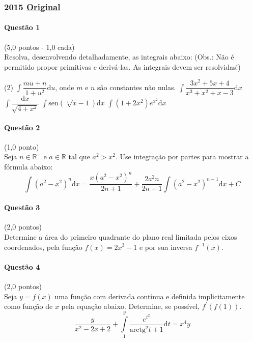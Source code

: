 \documentclass[12pt,a4paper]{article}
\newcommand{\R}{\mathbb{R}}
\newcommand{\original}[1]{\tiny \href{#1}{Original} \normalsize}
\begin{document}
\newpage
\subsubsection{2015 \original{https://drive.google.com/open?id=1dBXZ8g77vz10Pv-SOPZ6VNYKsHVNDqgd}}

\paragraph{Questão 1} (5,0 pontos - 1,0 cada)\\
Resolva, desenvolvendo detalhadamente, as integrais abaixo:
(Obs.: Não é permitido propor primitivas e derivá-las. As integrais devem ser resolvidas!)

\begin{tasks}(2)
\task $\displaystyle\int \dfrac{mu+n}{1+u^2}\mathrm{d}u$, onde $m$ e $n$ são constantes não nulas.
\task $\displaystyle\int \dfrac{3x^2 + 5x + 4}{x^3 + x^2 + x -3}\mathrm{d}x$
\task $\displaystyle\int \dfrac{\mathrm{d}x}{\sqrt{4+x^2}}$
\task $\displaystyle\int \mathrm{sen}(\sqrt[4]{x-1})\mathrm{d}x$
\task $\displaystyle\int (1+2x^2)e^{x^2}\mathrm{d}x$
\end{tasks}

\paragraph{Questão 2} (1,0 ponto)\\
Seja $n\in \R^+$ e $a\in\R$ tal que $a^2>x^2$. Use integração por partes para mostrar a fórmula abaixo:$$\int (a^2-x^2)^n\mathrm{d}x = \dfrac{x(a^2-x^2)^n}{2n+1} + \dfrac{2a^2n}{2n+1}\int (a^2-x^2)^{n-1}\mathrm{d}x + C$$ 

\paragraph{Questão 3} (2,0 pontos)\\
Determine a área do primeiro quadrante do plano real limitada pelos eixos coordenados, pela função $f(x) = 2x^3 - 1$ e por sua inversa $f^{-1}(x)$.

\paragraph{Questão 4} (2,0 pontos)\\
Seja $y=f(x)$ uma função com derivada contínua e definida implicitamente como função de $x$ pela equação abaixo. Determine, se possível, $f^{\prime}(f(1))$.$$\dfrac{y}{x^2-2x+2} + \int\limits_1^y \dfrac{e^{t^2}}{\mathrm{arctg}^2t + 1}\mathrm{d}t = x^4y$$
\end{document}

